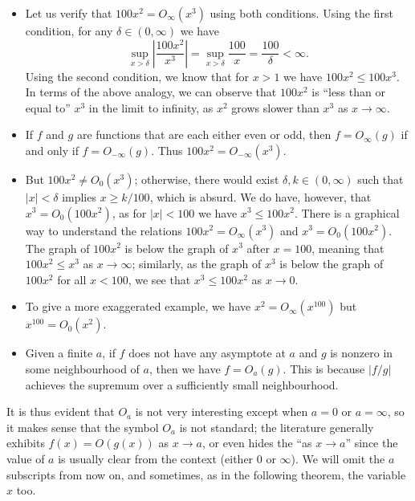 \documentclass{article}
\theoremstyle{definition}
\newcommand\abs[1]{\left\lvert#1\right\rvert}
\begin{document}
\begin{itemize}
    \item Let us verify that \(100x^2 = O_{\infty}(x^3)\) using both conditions.
        Using the first condition, for any \(\delta\in(0,\infty)\) we have
        \[\sup_{x>\delta}\abs{\frac{100x^2}{x^3}} = \sup_{x>\delta}\frac{100}{x} = \frac{100}{\delta} < \infty.\]
        Using the second condition, we know that for \(x>1\) we have \(100x^2 \leq 100x^3\).
        In terms of the above analogy, we can observe that \(100x^2\) is ``less than or equal to'' \(x^3\) in the limit to infinity, as \(x^2\) grows slower than \(x^3\) as \(x\to\infty\).
        
    \item If \(f\) and \(g\) are functions that are each either even or odd, then \(f = O_{\infty}(g)\) if and only if \(f = O_{-\infty}(g)\).
        Thus \(100x^2 = O_{-\infty}(x^3)\).

    \item But \(100x^2 \ne O_0(x^3)\); otherwise, there would exist \(\delta,k\in(0,\infty)\) such that \(\abs x < \delta\) implies \(x \geq k/100\), which is absurd.
        We do have, however, that \(x^3 = O_0(100x^2)\), as for \(\abs x < 100\) we have \(x^3 \leq 100x^2\).
        There is a graphical way to understand the relations \(100x^2 = O_{\infty}(x^3)\) and \(x^3 = O_0(100x^2)\).
        The graph of \(100x^2\) is below the graph of \(x^3\) after \(x=100\), meaning that \(100x^2 \leq x^3\) as \(x\to\infty\); similarly, as the graph of \(x^3\) is below the graph of \(100x^2\) for all \(x<100\), we see that \(x^3 \leq 100x^2\) as \(x\to 0\).

    \item To give a more exaggerated example, we have \(x^2 = O_{\infty}(x^{100})\) but \(x^{100} = O_0(x^2)\).

    \item Given a finite \(a\), if \(f\) does not have any asymptote at \(a\) and \(g\) is nonzero in some neighbourhood of \(a\), then we have \(f = O_a(g)\).
        This is because \(\abs{f/g}\) achieves the supremum over a sufficiently small neighbourhood.
\end{itemize}

It is thus evident that \(O_a\) is not very interesting except when \(a=0\) or \(a=\infty\), so it makes sense that the symbol \(O_a\) is not standard; the literature generally exhibits \(f(x) = O(g(x))\) as \(x\to a\), or even hides the ``as \(x\to a\)'' since the value of \(a\) is usually clear from the context (either \(0\) or \(\infty\)).
We will omit the \(a\) subscripts from now on, and sometimes, as in the following theorem, the variable \(x\) too.
\end{document}
